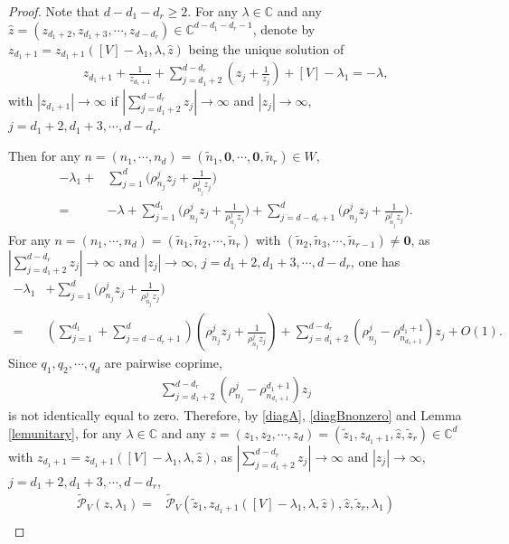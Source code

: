 \documentclass[10pt,a4paper]{amsart}
\def\C{{\mathbb C}}
\newcommand{\abs}[1]{\left\lvert #1 \right\rvert}
\begin{document}
\begin{proof}
Note that $d-d_1-d_r\geq 2$.  For any $\lambda\in\C$ and any $\hat{z}=(z_{d_1+2},z_{d_1+3},\cdots,z_{d-d_r})\in\C^{d-d_1-d_r-1}$, denote by $z_{d_1+1}=z_{d_1+1}([V]-\lambda_1,\lambda,\hat{z})$ being the unique solution of
\begin{align}
z_{d_1+1}+\frac{1}{z_{d_1+1}}+\sum_{j=d_1+2}^{d-d_r}\left(z_j+\frac{1}{z_j}\right)+[V]-\lambda_1=-\lambda,\label{zd1lambda}
\end{align}
with $\abs{z_{d_1+1}}\to\infty$ if
$\abs{\sum_{j=d_1+2}^{d-d_r}z_j}\to\infty$
and $\abs{z_j}\to\infty$, $j=d_1+2,d_1+3,\cdots,d-d_r$.

Then for any $n=(n_1,\cdots,n_d)=(\tilde{n}_1,\mathbf{0},\cdots,\mathbf{0},\tilde{n}_r)\in W$,
\begin{align}
[V]-\lambda_1+&\sum_{j=1}^d\Big(\rho^j_{n_j}z_j+\frac{1}{\rho^j_{n_j}z_j}\Big)\nonumber\\
=&-\lambda+\sum_{j=1}^{d_1}\Big(\rho^j_{n_j}z_j+\frac{1}{\rho^j_{n_j}z_j}\Big)+\sum_{j=d-d_r+1}^{d}
\Big(\rho^j_{n_j}z_j+\frac{1}{\rho^j_{n_j}z_j}\Big).\label{diagA}
\end{align}
For any $n=(n_1,\cdots,n_d)=(\tilde{n}_1,\tilde{n}_2,\cdots,\tilde{n}_r)$ with $(\tilde{n}_2,\tilde{n}_3,\cdots,\tilde{n}_{r-1})\neq \mathbf{0}$, as $\abs{\sum_{j=d_1+2}^{d-d_r}z_j}\to\infty$
and $\abs{z_j}\to\infty$, $j=d_1+2,d_1+3,\cdots,d-d_r$, one has
\begin{align}
[V]-\lambda_1&+\sum_{j=1}^d\Big(\rho^j_{n_j}z_j+\frac{1}{\rho^j_{n_j}z_j}\Big)\nonumber\\
=&\left(\sum_{j=1}^{d_1}+\sum_{j=d-d_r+1}^{d}\right)\left(\rho^j_{n_j}z_j+\frac{1}{\rho^j_{n_j}z_j}\right)+\sum_{j={d_1+2}}^{d-d_r}\left(\rho^j_{n_j}-\rho^{d_1+1}_{n_{d_1+1}}\right)z_j+O(1).\label{diagBnonzero}
\end{align}
Since $q_1,q_2,\cdots,q_d$ are pairwise coprime,
\begin{align}
\sum_{j={d_1+2}}^{d-d_r}\left(\rho^j_{n_j}-\rho^{d_1+1}_{n_{d_1+1}}\right)z_j\nonumber
\end{align}
is not identically equal to zero.
Therefore, by \eqref{diagA}, \eqref{diagBnonzero} and Lemma \ref{lemunitary}, for any $\lambda\in\C$ and any $z=(z_1,z_2,\cdots,z_d)=(\tilde{z}_1,z_{d_1+1},\hat{z},\tilde{z}_r)\in\C^d$ with $z_{d_1+1}=z_{d_1+1}([V]-\lambda_1,\lambda,\hat{z})$,
as $\abs{\sum_{j=d_1+2}^{d-d_r}z_j}\to\infty$
and $\abs{z_j}\to\infty$, $j=d_1+2,d_1+3,\cdots,d-d_r$,
\begin{align}
\tilde{\mathcal{P}}_V(z,\lambda_1)=&\tilde{\mathcal{P}}_V(\tilde{z}_1,z_{d_1+1}([V]-\lambda_1,\lambda,\hat{z}),\hat{z},\tilde{z}_r,\lambda_1)\label{pvz1fer}\\

\end{align}
\end{proof}
\end{document}
